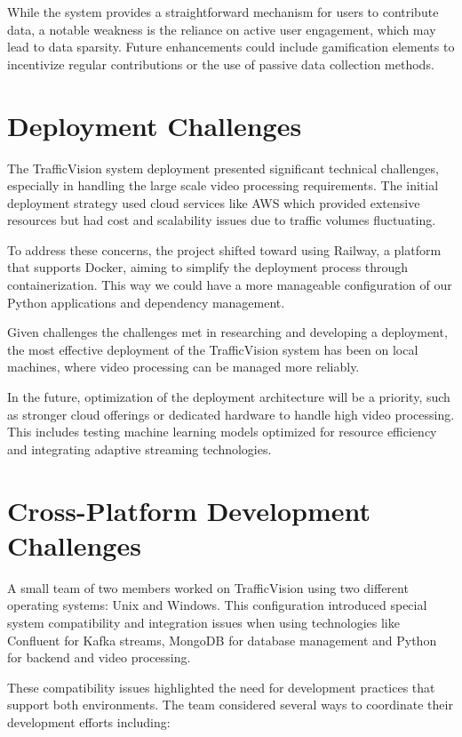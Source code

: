 While the system provides a straightforward mechanism for users to contribute data, a notable weakness is the reliance on active user engagement, which may lead to data sparsity. Future enhancements could include gamification elements to incentivize regular contributions or the use of passive data collection methods.

\section{Deployment Challenges}
The TrafficVision system deployment presented significant technical challenges, especially in handling the large scale video processing requirements. The initial deployment strategy used cloud services like AWS which provided extensive resources but had cost and scalability issues due to traffic volumes fluctuating.

To address these concerns, the project shifted toward using Railway\cite{railway2024}, a platform that supports Docker, aiming to simplify the deployment process through containerization. This way we could have a more manageable configuration of our Python applications and dependency management.

Given challenges the challenges met in researching and developing a deployment, the most effective deployment of the TrafficVision system has been on local machines, where video processing can be managed more reliably.

In the future, optimization of the deployment architecture will be a priority, such as stronger cloud offerings or dedicated hardware to handle high video processing. This includes testing machine learning models optimized for resource efficiency and integrating adaptive streaming technologies.

\section{Cross-Platform Development Challenges}
A small team of two members worked on TrafficVision using two different operating systems: Unix and Windows. This configuration introduced special system compatibility and integration issues when using technologies like Confluent for Kafka streams, MongoDB for database management and Python for backend and video processing.

These compatibility issues highlighted the need for development practices that support both environments. The team considered several ways to coordinate their development efforts including:

